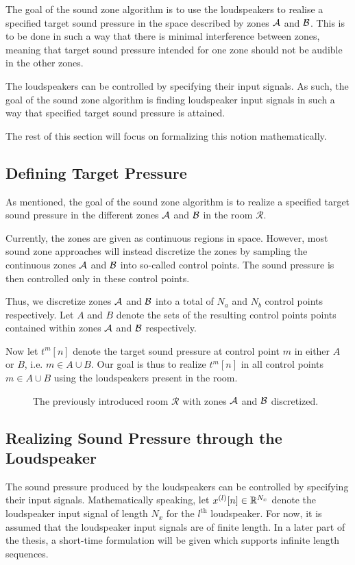 The goal of the sound zone algorithm is to use the loudspeakers to realise a specified target sound pressure
in the space described by zones $\mathcal{A}$ and $\mathcal{B}$.
This is to be done in such a way that there is minimal interference between zones, 
meaning that target sound pressure intended for one zone should not be audible in the other zones.

The loudspeakers can be controlled by specifying their input signals.
As such, the goal of the sound zone algorithm is finding loudspeaker input signals in such a way that 
specified target sound pressure is attained.

The rest of this section will focus on formalizing this notion mathematically.

\subsection{Defining Target Pressure}
\label{ch:sound_zone:data_model:target_pressure}
As mentioned, the goal of the sound zone algorithm is to realize a specified target sound pressure
in the different zones $\mathcal{A}$ and $\mathcal{B}$ in the room $\mathcal{R}$.

Currently, the zones are given as continuous regions in space.
However, most sound zone approaches will instead discretize the zones by sampling the continuous zones 
$\mathcal{A}$ and $\mathcal{B}$ into so-called control points.
The sound pressure is then controlled only in these control points.

Thus, we discretize zones $\mathcal{A}$ and $\mathcal{B}$ into a total of $N_a$ and $N_b$ control points respectively.   
Let $A$ and $B$ denote the sets of the resulting control points points contained within zones $\mathcal{A}$ and $\mathcal{B}$ respectively.

Now let $t^{m}[n]$ denote the target sound pressure at control point $m$ in either $A$ or $B$, i.e. $m\in A \cup B$.
Our goal is thus to realize $t^{m}[n]$ in all control points $m\in A \cup B$ using the loudspeakers present in the room.

\begin{figure}
    \centering
    
    \caption{The previously introduced room $\mathcal{R}$ with zones $\mathcal{A}$ and $\mathcal{B}$ discretized.}
\end{figure}

\subsection{Realizing Sound Pressure through the Loudspeaker}
\label{ch:sound_zone:data_model:realizing_pressure}
The sound pressure produced by the loudspeakers can be controlled by specifying their input signals.
Mathematically speaking, let $x^{(l)}[n]\in\mathbb{R}^{N_x}$ denote the loudspeaker input signal of length $N_x$ for the $l^\text{th}$ loudspeaker.
For now, it is assumed that the loudspeaker input signals are of finite length. 
In a later part of the thesis, a short-time formulation will be given which supports infinite length sequences. 

